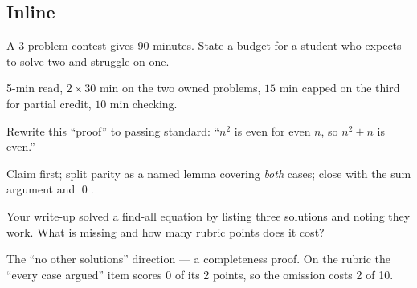 \subsection*{Inline}
\begin{exercise}[easy]\label{exr:ex1}
A 3-problem contest gives 90 minutes. State a budget for a student who
expects to solve two and struggle on one.
\end{exercise}
\begin{solution}
5-min read, $2\times30$ min on the two owned problems, $15$ min capped
on the third for partial credit, $10$ min checking.
\end{solution}
\begin{exercise}[medium]\label{exr:ex2}
Rewrite this ``proof'' to passing standard: ``$n^2$ is even for even
$n$, so $n^2+n$ is even.''
\end{exercise}
\begin{solution}
Claim first; split parity as a named lemma covering \emph{both} cases;
close with the sum argument and \qed.
\end{solution}
\begin{exercise}[medium]\label{exr:ex3}
Your write-up solved a find-all equation by listing three solutions
and noting they work. What is missing and how many rubric points does
it cost?
\end{exercise}
\begin{solution}
The ``no other solutions'' direction --- a completeness proof. On the
rubric the ``every case argued'' item scores 0 of its 2 points, so the
omission costs 2 of 10.
\end{solution}
